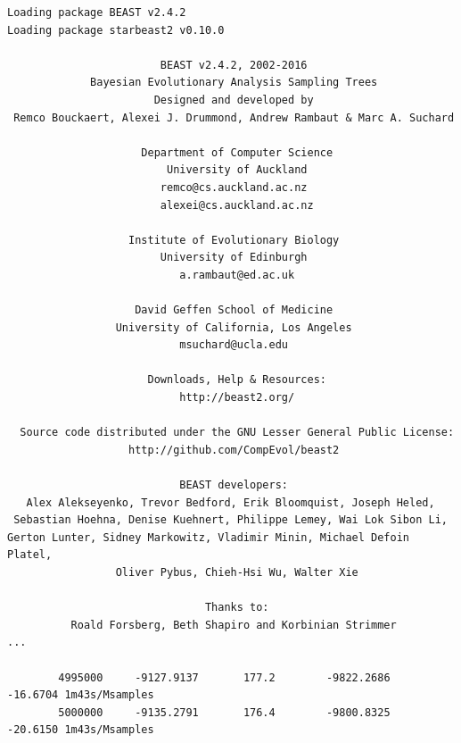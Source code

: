 \documentclass{article}
\begin{document}
{\scriptsize
\begin{verbatim}
Loading package BEAST v2.4.2
Loading package starbeast2 v0.10.0

                        BEAST v2.4.2, 2002-2016
             Bayesian Evolutionary Analysis Sampling Trees
                       Designed and developed by
 Remco Bouckaert, Alexei J. Drummond, Andrew Rambaut & Marc A. Suchard
                                    
                     Department of Computer Science
                         University of Auckland
                        remco@cs.auckland.ac.nz
                        alexei@cs.auckland.ac.nz
                                    
                   Institute of Evolutionary Biology
                        University of Edinburgh
                           a.rambaut@ed.ac.uk
                                    
                    David Geffen School of Medicine
                 University of California, Los Angeles
                           msuchard@ucla.edu
                                    
                      Downloads, Help & Resources:
                           http://beast2.org/
                                    
  Source code distributed under the GNU Lesser General Public License:
                   http://github.com/CompEvol/beast2
                                    
                           BEAST developers:
   Alex Alekseyenko, Trevor Bedford, Erik Bloomquist, Joseph Heled, 
 Sebastian Hoehna, Denise Kuehnert, Philippe Lemey, Wai Lok Sibon Li, 
Gerton Lunter, Sidney Markowitz, Vladimir Minin, Michael Defoin Platel, 
                 Oliver Pybus, Chieh-Hsi Wu, Walter Xie
                                    
                               Thanks to:
          Roald Forsberg, Beth Shapiro and Korbinian Strimmer
...

        4995000     -9127.9137       177.2        -9822.2686       -16.6704 1m43s/Msamples
        5000000     -9135.2791       176.4        -9800.8325       -20.6150 1m43s/Msamples


\end{verbatim}}
\end{document}
